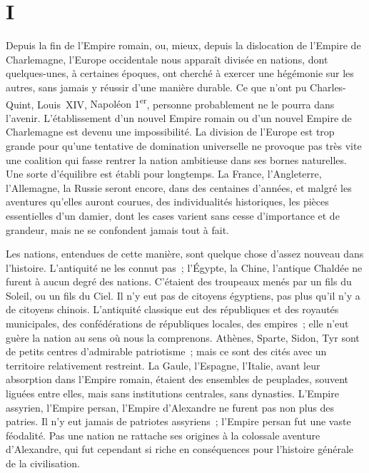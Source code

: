 \documentclass[french,twoside]{book} %
\newcommand\orgName[1]{#1}
\newcommand\persName[1]{#1}
\newcommand\placeName[1]{#1}
\newcommand\chapteropen{} %
\newcommand\chaptercont{} %
\begin{document}
\chapteropen
\chapter[{I}]{I}\renewcommand{\leftmark}{I}


\chaptercont
\noindent Depuis la fin de l’{\orgName Empire romain}, ou, mieux, depuis la dislocation de l’{\orgName Empire de Charlemagne}, l’{\placeName Europe occidentale} nous apparaît divisée en nations, dont quelques-unes, à certaines époques, ont cherché à exercer une hégémonie sur les autres, sans jamais y réussir d’une manière durable. Ce que n’ont pu {\persName Charles-Quint}, {\persName Louis XIV}, {\persName Napoléon 1\textsuperscript{er}}, personne probablement ne le pourra dans l’avenir. L’établissement d’un nouvel {\orgName Empire romain} ou d’un nouvel {\orgName Empire de Charlemagne} est devenu une impossibilité. La division de l’{\orgName Europe} est trop grande pour qu’une tentative de domination universelle ne provoque pas très vite une coalition qui fasse rentrer la nation ambitieuse dans ses bornes naturelles. Une sorte d’équilibre est établi pour longtemps. La {\orgName France}, l’{\orgName Angleterre}, l’{\orgName Allemagne}, la {\orgName Russie} seront encore, dans des centaines d’années, et malgré les aventures qu’elles auront courues, des individualités historiques, les pièces essentielles d’un damier, dont les cases varient sans cesse d’importance et de grandeur, mais ne se confondent jamais tout à fait.\par
Les nations, entendues de cette manière, sont quelque chose d’assez nouveau dans l’histoire. L’antiquité ne les connut pas ; l’{\orgName Égypte}, la {\orgName Chine}, l’antique {\orgName Chaldée} ne furent à aucun degré des nations. C’étaient des troupeaux menés par un fils du Soleil, ou un fils du Ciel. Il n’y eut pas de citoyens égyptiens, pas plus qu’il n’y a de citoyens chinois. L’antiquité classique eut des républiques et des royautés municipales, des confédérations de républiques locales, des empires ; elle n’eut guère la nation au sens où nous la comprenons. {\orgName Athènes}, {\orgName Sparte}, {\orgName Sidon}, {\orgName Tyr} sont de petits centres d’admirable patriotisme ; mais ce sont des cités avec un territoire relativement restreint. La {\orgName Gaule}, l’{\orgName Espagne}, l’{\orgName Italie}, avant leur absorption dans l’{\orgName Empire romain}, étaient des ensembles de peuplades, souvent liguées entre elles, mais sans institutions centrales, sans dynasties. L’{\orgName Empire assyrien}, l’{\orgName Empire persan}, l’{\orgName Empire d’Alexandre} ne furent pas non plus des patries. Il n’y eut jamais de patriotes assyriens ; l’{\orgName Empire persan} fut une vaste féodalité. Pas une nation ne rattache ses origines à la colossale aventure d’{\persName Alexandre}, qui fut cependant si riche en conséquences pour l’histoire générale de la civilisation.\par
\end{document}
